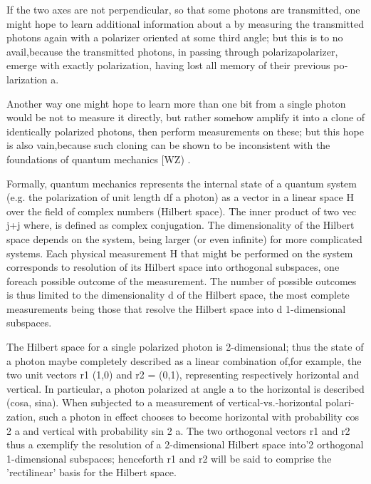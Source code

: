 If the two axes are not perpendicular, so that some photons are transmitted, one might hope to learn additional information about a by measuring the transmitted photons again with a polarizer ori­ented at some third angle; but this is to no avail,because the transmitted photons, in passing through polariza­polarizer, emerge with exactly polarization, having lost all memory of their previous po­larization a.

Another way one might hope to learn more than one bit from a single photon would be not to measure it directly, but rather somehow amplify it into a clone of identically polarized photons, then perform measurements on these; but this hope is also vain,because such cloning can be shown to be inconsistent with the foundations of quantum mechanics [WZ) .

Formally, quantum mechanics represents the internal state of a quantum system (e.g. the polarization ­of unit length df a photon) as a vector in a linear space H over the field of complex num­bers (Hilbert space). The inner product of two vec j+j where, is defined as complex conjugation. The dimensionality of the Hilbert space depends on the system, being larg­er (or even infinite) for more complicated systems. Each physical measurement H that might be performed on the system corresponds to resolution of its Hilbert space into orthogonal subspaces, one foreach possible outcome of the measurement. The num­ber of possible outcomes is thus limited to the dimensionality d of the Hilbert space, the most complete measurements being those that resolve the Hilbert space into d 1-dimensional subspaces.

The Hilbert space for a single polarized pho­ton is 2-dimensional; thus the state of a photon maybe completely described as a linear combination of,for example, the two unit vectors r1  (1,0) and r2 = (0,1), representing respectively horizontal and vertical. In particular, a photon  polarized at angle a to the horizontal is described (cosa, sina). When subjected to a measurement of vertical-vs.-horizontal polari­zation, such a photon in effect chooses to become horizontal with probability cos 2 a and vertical with probability sin 2 a. The two orthogonal vectors r1 and r2 thus a exemplify the resolution of a 2-dimensional Hilbert space into'2 orthogonal 1-dimensional subspaces; henceforth r1 and r2 will be said to comprise the 'rectilinear' basis for the Hilbert space.


